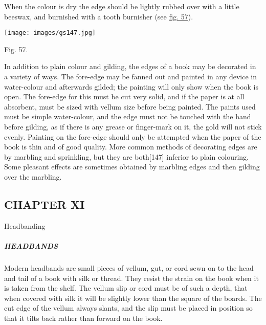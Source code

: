 \documentclass[
]{article}
\begin{document}
When the colour is dry the edge should be lightly rubbed over with a
little beeswax, and burnished with a tooth burnisher (see
\protect\hyperlink{Fig_57}{fig. 57}).

\protect\hypertarget{Fig_57}{}{}
\texttt{[image: images/gs147.jpg]}

Fig. 57.

In addition to plain colour and gilding, the edges of a book may be
decorated in a variety of ways. The fore-edge may be fanned out and
painted in any device in water-colour and afterwards gilded; the
painting will only show when the book is open. The fore-edge for this
must be cut very solid, and if the paper is at all absorbent, must be
sized with vellum size before being painted. The paints used must be
simple water-colour, and the edge must not be touched with the hand
before gilding, as if there is any grease or finger-mark on it, the gold
will not stick evenly. Painting on the fore-edge should only be
attempted when the paper of the book is thin and of good quality. More
common methods of decorating edges are by marbling and sprinkling, but
they are both{\protect\hypertarget{Page_147}{}{{[}147{]}}} inferior to
plain colouring. Some pleasant effects are sometimes obtained by
marbling edges and then gilding over the marbling.

\hypertarget{chapter-xi}{%
\subsection[CHAPTER
XI]{\texorpdfstring{\protect\hypertarget{CHAPTER_XI}{}{}CHAPTER
XI}{CHAPTER XI}}\label{chapter-xi}}

Headbanding

\hypertarget{headbands}{%
\subparagraph{HEADBANDS}\label{headbands}}

{Modern} headbands are small pieces of vellum, gut, or cord sewn on to
the head and tail of a book with silk or thread. They resist the strain
on the book when it is taken from the shelf. The vellum slip or cord
must be of such a depth, that when covered with silk it will be slightly
lower than the square of the boards. The cut edge of the vellum always
slants, and the slip must be placed in position so that it tilts back
rather than forward on the book.
\end{document}
